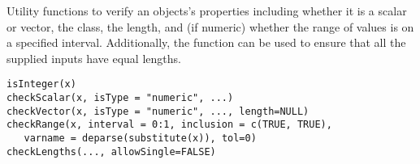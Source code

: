 \begin{Description}\relax
Utility functions to verify an objects's properties including whether it is a scalar or vector,
the class, the length, and (if numeric) whether the range of values is on a specified interval. Additionally,
the  function can be used to ensure that all the supplied inputs have equal lengths.
\end{Description}
\begin{Usage}
\begin{verbatim}
isInteger(x)
checkScalar(x, isType = "numeric", ...)
checkVector(x, isType = "numeric", ..., length=NULL) 
checkRange(x, interval = 0:1, inclusion = c(TRUE, TRUE), 
   varname = deparse(substitute(x)), tol=0)
checkLengths(..., allowSingle=FALSE)
\end{verbatim}
\end{Usage}
